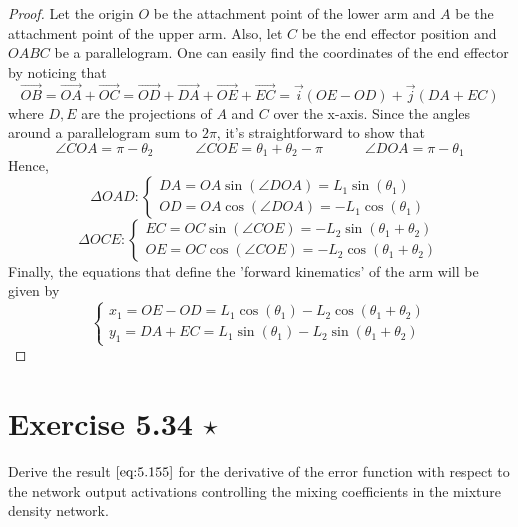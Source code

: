 \begin{proof}
    Let the origin $O$ be the attachment point of the lower arm 
    and $A$ be the attachment point of the upper arm. Also,
    let $C$ be the end effector position and $OABC$ be a parallelogram.
    One can easily find the coordinates of the end effector by noticing that
    \[
        \overrightarrow{OB} 
        = \overrightarrow{OA} + \overrightarrow{OC}
        = \overrightarrow{OD} + \overrightarrow{DA} + 
        \overrightarrow{OE} + \overrightarrow{EC} 
        = \overrightarrow{i}(OE - OD) + \overrightarrow{j}(DA + EC) 
    \] 
    where $D, E$ are the projections of $A$ and $C$ over the x-axis.
    Since the angles around a parallelogram sum to $2\pi$, it's straightforward
    to show that
    \[
        \angle{COA} = \pi - \theta_2
        \hspace{3em}
        \angle{COE} = \theta_1 + \theta_2 - \pi
        \hspace{3em}
        \angle{DOA} = \pi - \theta_1
    \] 
    Hence,
    \[
        \Delta OAD:
        \begin{cases}
            DA = OA\sin(\angle DOA) = L_1 \sin(\theta_1) \\
            OD = OA\cos(\angle DOA) = -L_1 \cos(\theta_1)
        \end{cases}
    \]
    \[
        \Delta OCE:
        \begin{cases}
            EC = OC\sin(\angle COE) = -L_2 \sin(\theta_1 + \theta_2) \\
            OE = OC\cos(\angle COE) = -L_2 \cos(\theta_1 + \theta_2)
        \end{cases}
    \] 
    Finally, the equations that define the 'forward kinematics' of
    the arm will be given by
    \[
        \begin{cases}
            x_1 = OE - OD = L_1 \cos(\theta_1) - L_2 \cos(\theta_1 + \theta_2) \\
            y_1 = DA + EC = L_1\sin(\theta_1) - L_2 \sin(\theta_1 + \theta_2)
        \end{cases}
    \] 
\end{proof}

\section*{Exercise 5.34 $\star$}
Derive the result $\eqref{eq:5.155}$ for the derivative
of the error function with respect to the network output 
activations controlling the mixing coefficients in the mixture
density network.

